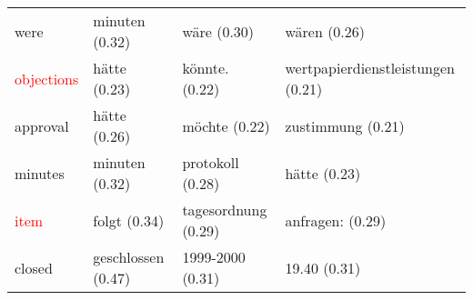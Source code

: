 \documentclass[11pt,twoside,openright]{mpreport}
\begin{document}
\begin{footnotesize}
\begin{tabular}{|llll|}
were                    & minuten (0.32) & wäre (0.30) & wären (0.26) \\ %
\textcolor{red}{objections}              & hätte (0.23) & könnte. (0.22) & wertpapierdienstleistungen (0.21) \\
approval                & hätte (0.26) & möchte (0.22) & zustimmung (0.21) \\ %
minutes                 & minuten (0.32) & protokoll (0.28) & hätte (0.23) \\ %
\textcolor{red}{item}                    & folgt (0.34) & tagesordnung (0.29) & anfragen: (0.29) \\ %
closed                  & geschlossen (0.47) & 1999-2000 (0.31) & 19.40 (0.31) \\ %
\hline
\end{tabular}\end{footnotesize}\\



\end{document}
